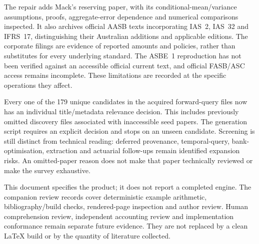 The repair adds Mack's reserving paper, with its conditional-mean/variance
assumptions, proofs, aggregate-error dependence and numerical comparisons
inspected. It also archives official AASB texts incorporating IAS~2, IAS~32
and IFRS~17, distinguishing their Australian additions and applicable editions.
The corporate filings are evidence of reported amounts and policies, rather
than substitutes for every underlying standard. The ASBE~1 reproduction has
not been verified against an accessible official current text, and official
FASB/ASC access remains incomplete. These limitations are recorded at the
specific operations they affect.

Every one of the 179 unique candidates in the acquired forward-query files
now has an individual title/metadata relevance decision. This includes
previously omitted discovery files associated with inaccessible seed papers.
The generation script requires an explicit decision and stops on an unseen
candidate. Screening is still distinct from technical reading: deferred
provenance, temporal-query, bank-optimisation, extraction and actuarial
follow-ups remain identified expansion risks. An omitted-paper reason does
not make that paper technically reviewed or make the survey exhaustive.

This document specifies the product; it does not report a completed engine.
The companion review records cover deterministic example arithmetic,
bibliography/build checks, rendered-page inspection and author review. Human
comprehension review, independent accounting review and implementation
conformance remain separate future evidence. They are not replaced by a clean
LaTeX build or by the quantity of literature collected.
